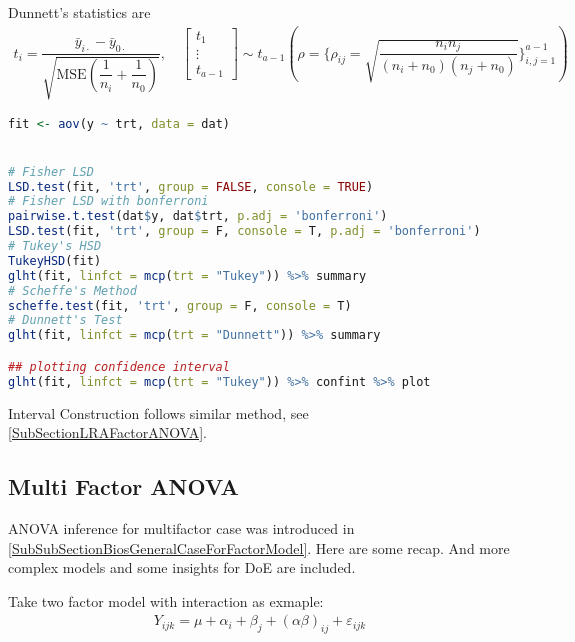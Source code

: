 \begin{itemize}[topsep=2pt,itemsep=0pt]
    Dunnett's statistics are
    \begin{align*}
        t_i=\dfrac{ \bar{y}_{i\cdot }-\bar{y}_{0\cdot } }{ \sqrt{ \mathrm{ MSE } (\dfrac{ 1 }{ n_i }+\dfrac{ 1  }{ n_0 }  ) }  },\quad \begin{bmatrix}
            t_1\\
            \vdots\\
            t_{a-1}
        \end{bmatrix}\sim t_{a-1}(\rho = \{\rho_{ij}=\sqrt{\dfrac{ n_in_j }{ (n_i+n_0)(n_j+n_0) } }\}_{i,j=1}^{a-1})
    \end{align*}
    
    
    
\end{itemize}


\begin{rcode}
\begin{lstlisting}[language=R]
fit <- aov(y ~ trt, data = dat) 


# Fisher LSD
LSD.test(fit, 'trt', group = FALSE, console = TRUE) 
# Fisher LSD with bonferroni
pairwise.t.test(dat$y, dat$trt, p.adj = 'bonferroni') 
LSD.test(fit, 'trt', group = F, console = T, p.adj = 'bonferroni') 
# Tukey's HSD
TukeyHSD(fit) 
glht(fit, linfct = mcp(trt = "Tukey")) %>% summary
# Scheffe's Method
scheffe.test(fit, 'trt', group = F, console = T) 
# Dunnett's Test 
glht(fit, linfct = mcp(trt = "Dunnett")) %>% summary

## plotting confidence interval
glht(fit, linfct = mcp(trt = "Tukey")) %>% confint %>% plot
\end{lstlisting}
\end{rcode}
    
    Interval Construction follows similar method, see \autoref{SubSectionLRAFactorANOVA}.












\subsection{Multi Factor ANOVA}

ANOVA inference for multifactor case was introduced in \autoref{SubSubSectionBiosGeneralCaseForFactorModel}. Here are some recap. And more complex models and some insights for DoE are included.

Take two factor model with interaction as exmaple:
\begin{align}
    Y_{ijk}=\mu +\alpha _i+\beta _j+(\alpha \beta )_{ij}+\varepsilon _{ijk} 
\end{align}

